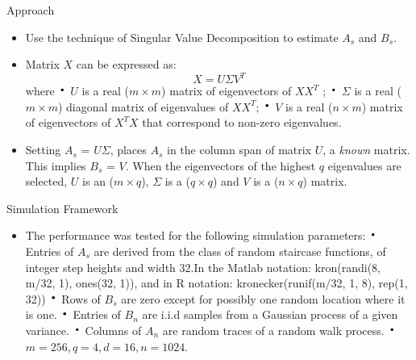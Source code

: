 \documentclass{beamer}
\newcommand*{\LargerCdot}{\raisebox{-0.25ex}{\scalebox{2.3}{$\cdot$}}}
\begin{document}
\begin{frame}{Approach}{}
	\begin{itemize}	
		\item{Use the technique of {\color{blue}Singular Value Decomposition} to estimate $A_s$ and $B_s$. } \newline	
		\item{Matrix $X$ can be expressed as:}
		\begin{equation}
			X = U \Sigma V^T
		\end{equation}  where \newline
		{$\LargerCdot$ $U$ is a real ($m \times m$) matrix of eigenvectors of $XX^T$ ;}\newline 
		{$\LargerCdot$ $\Sigma$ is a real ($m \times m$) diagonal matrix of eigenvalues of $XX^T$;}\newline 
		{$\LargerCdot$ $V$ is a real ($n \times m$) matrix of eigenvectors of $X^TX$ that correspond to non-zero eigenvalues.}\newline 
		\item{Setting $A_s$ = $U\Sigma$, places $A_s$ in the column span of matrix $U$, a \textit{known} matrix. This implies $B_s$ = $V$. When the eigenvectors of the highest $q$ eigenvalues are selected, $U$ is an ($m \times q$), $\Sigma$ is a ($q \times q$) and $V$ is a ($n \times q$) matrix.} \vspace{0.2 in}
	\end{itemize}
\end{frame}


\begin{frame}{Simulation Framework}{}
	\begin{itemize}
		\item{The performance was tested for the following simulation parameters:}\vspace{0.1 in}\newline
		{$\LargerCdot$ Entries of $A_s$ are derived from the class of random staircase functions, of integer 					step heights and width 32.\newline In the Matlab notation:
					kron(randi(8, m/32, 1), ones(32, 1)),  and in R notation: kronecker(runif(m/32, 1, 8), rep(1, 32))}\newline
		{$\LargerCdot$ Rows of $B_s$ are zero except for possibly one random location where it is one.}\newline
		{$\LargerCdot$ Entries of $B_n$ are i.i.d samples from a Gaussian process of a given variance.}\newline
		{$\LargerCdot$ Columns of $A_n$ are random traces of a random walk process.}\newline
		{$\LargerCdot$ $m=256,q=4,d=16,n=1024$.}
	\end{itemize}
\end{frame}
\end{document}
